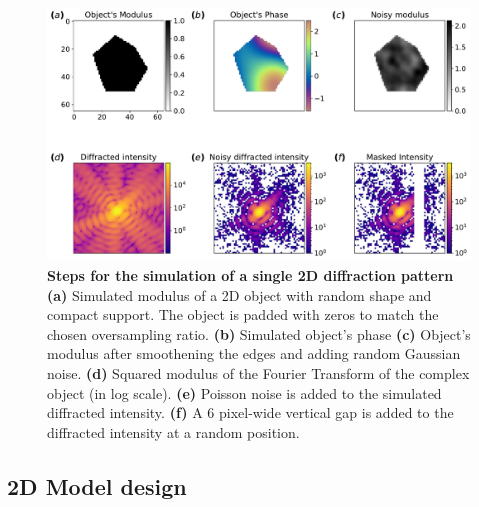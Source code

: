 \begin{figure}[h]
    \includegraphics[width=\textwidth]{figures/Inpainting/2D_dataset_creation.pdf}
    \caption{\textbf{Steps for the simulation of a single 2D diffraction pattern} 
    \textbf{(a)} Simulated modulus of a 2D object with random shape and compact support. The object is padded with 
    zeros to match the chosen oversampling ratio. \textbf{(b)} Simulated object's phase
    \textbf{(c)} Object's modulus after smoothening the edges and adding random Gaussian noise. \textbf{(d)} Squared modulus of the Fourier Transform
    of the complex object (in log scale).
    \textbf{(e)} Poisson noise is added to the simulated diffracted intensity. \textbf{(f)} A 6 pixel-wide
    vertical gap is added to the diffracted intensity at a random position.}
    \label{fig:2D_dataset_creation}
\end{figure}


\subsection{2D Model design}

